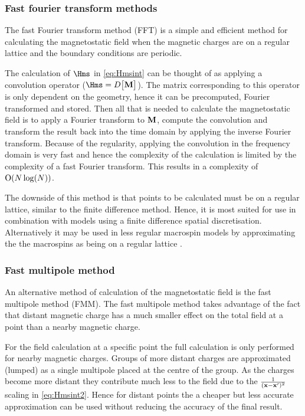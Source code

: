 \subsubsection{Fast fourier transform methods}

The fast Fourier transform method (FFT) is a simple and efficient method for calculating the magnetostatic field when the magnetic charges are on a regular lattice and the boundary conditions are periodic.

The calculation of $\Hms$ in \cref{eq:Hmsint} can be thought of as applying a convolution operator (\ie $\Hms = D \big[\Mv\big]$).
The matrix corresponding to this operator is only dependent on the geometry, hence it can be precomputed, Fourier transformed and stored.
Then all that is needed to calculate the magnetostatic field is to apply a Fourier transform to $\mathbf{M}$, compute the convolution and transform the result back into the time domain by applying the inverse Fourier transform.
Because of the regularity, applying the convolution in the frequency domain is very fast and hence the complexity of the calculation is limited by the complexity of a fast Fourier transform.
This results in a complexity of $\text{O}{\left( N \log(N) \right)}$.
\cite{Jones1997}

The downside of this method is that points to be calculated must be on a regular lattice, similar to the finite difference method.
Hence, it is most suited for use in combination with models using a finite difference spatial discretisation.
Alternatively it may be used in less regular macrospin models by approximating the the macrospins as being on a regular lattice \cite{Jones1997}.


\subsubsection{Fast multipole method}
\label{sec:fast-mult-meth}

An alternative method of calculation of the magnetostatic field is the fast multipole method (FMM).
The fast multipole method takes advantage of the fact that distant magnetic charge has a much smaller effect on the total field at a point than a nearby magnetic charge.

For the field calculation at a specific point the full calculation is only performed for nearby magnetic charges.
Groups of more distant charges are approximated (lumped) as a single multipole placed at the centre of the group.
As the charges become more distant they contribute much less to the field due to the $\frac{1}{(\mathbf{x} - \mathbf{x}')^2}$ scaling in \cref{eq:Hmsint2}.
Hence for distant points the a cheaper but less accurate approximation can be used without reducing the accuracy of the final result.

